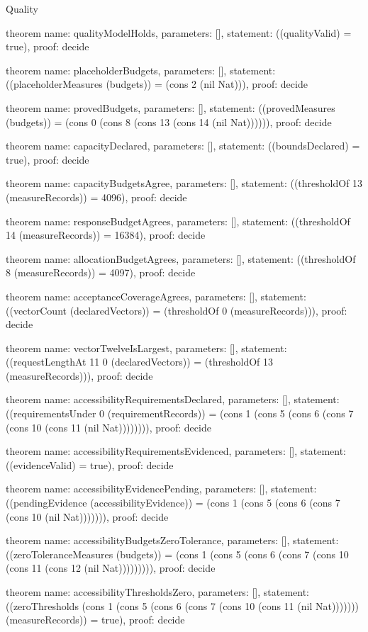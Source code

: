 \begin{lexlean}{Quality}
\begin{semanticmodule}
theorem{
  name: qualityModelHolds,
  parameters: [],
  statement: ((qualityValid) = true),
  proof: decide{}
}

theorem{
  name: placeholderBudgets,
  parameters: [],
  statement: ((placeholderMeasures (budgets)) = (cons 2 (nil Nat))),
  proof: decide{}
}

theorem{
  name: provedBudgets,
  parameters: [],
  statement: ((provedMeasures (budgets)) = (cons 0 (cons 8 (cons 13 (cons 14 (nil Nat)))))),
  proof: decide{}
}

theorem{
  name: capacityDeclared,
  parameters: [],
  statement: ((boundsDeclared) = true),
  proof: decide{}
}

theorem{
  name: capacityBudgetsAgree,
  parameters: [],
  statement: ((thresholdOf 13 (measureRecords)) = 4096),
  proof: decide{}
}

theorem{
  name: responseBudgetAgrees,
  parameters: [],
  statement: ((thresholdOf 14 (measureRecords)) = 16384),
  proof: decide{}
}

theorem{
  name: allocationBudgetAgrees,
  parameters: [],
  statement: ((thresholdOf 8 (measureRecords)) = 4097),
  proof: decide{}
}

theorem{
  name: acceptanceCoverageAgrees,
  parameters: [],
  statement: ((vectorCount (declaredVectors)) = (thresholdOf 0 (measureRecords))),
  proof: decide{}
}

theorem{
  name: vectorTwelveIsLargest,
  parameters: [],
  statement: ((requestLengthAt 11 0 (declaredVectors)) = (thresholdOf 13 (measureRecords))),
  proof: decide{}
}

theorem{
  name: accessibilityRequirementsDeclared,
  parameters: [],
  statement: ((requirementsUnder 0 (requirementRecords)) = (cons 1 (cons 5 (cons 6 (cons 7 (cons 10 (cons 11 (nil Nat)))))))),
  proof: decide{}
}

theorem{
  name: accessibilityRequirementsEvidenced,
  parameters: [],
  statement: ((evidenceValid) = true),
  proof: decide{}
}

theorem{
  name: accessibilityEvidencePending,
  parameters: [],
  statement: ((pendingEvidence (accessibilityEvidence)) = (cons 1 (cons 5 (cons 6 (cons 7 (cons 10 (nil Nat))))))),
  proof: decide{}
}

theorem{
  name: accessibilityBudgetsZeroTolerance,
  parameters: [],
  statement: ((zeroToleranceMeasures (budgets)) = (cons 1 (cons 5 (cons 6 (cons 7 (cons 10 (cons 11 (cons 12 (nil Nat))))))))),
  proof: decide{}
}

theorem{
  name: accessibilityThresholdsZero,
  parameters: [],
  statement: ((zeroThresholds (cons 1 (cons 5 (cons 6 (cons 7 (cons 10 (cons 11 (nil Nat))))))) (measureRecords)) = true),
  proof: decide{}
}
\end{semanticmodule}
\end{lexlean}
